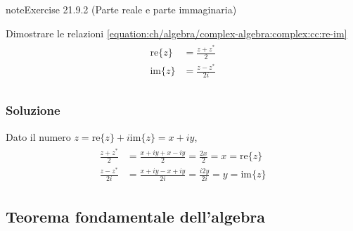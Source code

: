 \documentclass[letterpaper,10pt,italian]{jupyterBook}
\begin{document}
\begin{sphinxadmonition}{note}{Exercise 21.9.2 (Parte reale e parte immaginaria)}



\sphinxAtStartPar
Dimostrare le relazioni \eqref{equation:ch/algebra/complex-algebra:complex:cc:re-im}
\begin{equation*}
\begin{split}\begin{aligned}
  \text{re}\{z\} & = \frac{z + z^*}{2} \\
  \text{im}\{z\} & = \frac{z - z^*}{2i} \\
\end{aligned}\end{split}
\end{equation*}\subsubsection*{Soluzione}

\sphinxAtStartPar
Dato il numero \(z = \text{re}\{z\} + i \text{im}\{z\} = x + i y\),
\begin{equation*}
\begin{split}\begin{aligned}
 \frac{z + z^*}{2}  & = \frac{x+iy+x-iy}{2}  = \frac{2x}{2} = x = \text{re}\{z\} \\
 \frac{z - z^*}{2i} & = \frac{x+iy-x+iy}{2i} = \frac{i2y}{2i} = y = \text{im}\{z\}
\end{aligned}\end{split}
\end{equation*}\end{sphinxadmonition}


\subsection{Teorema fondamentale dell’algebra}
\label{\detokenize{ch/algebra/complex-algebra-problems:teorema-fondamentale-dell-algebra}}\label{\detokenize{ch/algebra/complex-algebra-problems:math-hs-algebra-complex-problems-fund-thm}} \label{exercise:ch/algebra/complex-algebra-problems-exercise-2}
\end{document}
